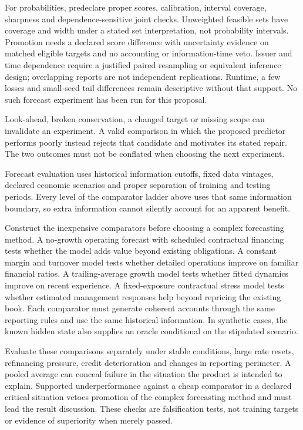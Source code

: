 For probabilities, predeclare proper scores, calibration, interval coverage,
sharpness and dependence-sensitive joint checks. Unweighted feasible sets have
coverage and width under a stated set interpretation, not probability intervals.
Promotion needs a declared score difference with uncertainty evidence on matched
eligible targets and no accounting or information-time veto. Issuer and time
dependence require a justified paired resampling or equivalent inference design;
overlapping reports are not independent replications. Runtime, a few losses and
small-seed tail differences remain descriptive without that support. No such
forecast experiment has been run for this proposal.

Look-ahead, broken conservation, a changed target or missing scope can invalidate
an experiment. A valid comparison in which the proposed predictor performs
poorly instead rejects that candidate and motivates its stated repair. The two
outcomes must not be conflated when choosing the next experiment.

Forecast evaluation uses historical information cutoffs, fixed data vintages,
declared economic scenarios and proper separation of training and testing
periods. Every level of the comparator ladder above uses that same information
boundary, so extra information cannot silently account for an apparent benefit.

Construct the inexpensive comparators before choosing a complex forecasting
method. A no-growth operating forecast with scheduled contractual financing
tests whether the model adds value beyond existing obligations. A constant
margin and turnover model tests whether detailed operations improve on familiar
financial ratios. A trailing-average growth model tests whether fitted dynamics
improve on recent experience. A fixed-exposure contractual stress model tests
whether estimated management responses help beyond repricing the existing
book. Each comparator must generate coherent accounts through the same reporting
rules and use the same historical information. In synthetic cases, the known
hidden state also supplies an oracle conditional on the stipulated scenario.

Evaluate these comparisons separately under stable conditions, large rate
resets, refinancing pressure, credit deterioration and changes in reporting
perimeter. A pooled average can conceal failure in the situation the product
is intended to explain. Supported underperformance against a cheap comparator
in a declared critical situation vetoes promotion of the complex forecasting
method and must lead the result discussion. These checks are falsification
tests, not training targets or evidence of superiority when merely passed.

